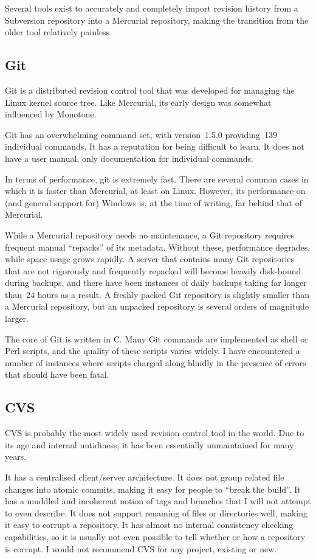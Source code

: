 Several tools exist to accurately and completely import revision
history from a Subversion repository into a Mercurial repository,
making the transition from the older tool relatively painless.

\subsection{Git}

Git is a distributed revision control tool that was developed for
managing the Linux kernel source tree.  Like Mercurial, its early
design was somewhat influenced by Monotone.

Git has an overwhelming command set, with version~1.5.0 providing~139
individual commands.  It has a reputation for being difficult to
learn.  It does not have a user manual, only documentation for
individual commands.

In terms of performance, git is extremely fast.  There are several
common cases in which it is faster than Mercurial, at least on Linux.
However, its performance on (and general support for) Windows is, at
the time of writing, far behind that of Mercurial.

While a Mercurial repository needs no maintenance, a Git repository
requires frequent manual ``repacks'' of its metadata.  Without these,
performance degrades, while space usage grows rapidly.  A server that
contains many Git repositories that are not rigorously and frequently
repacked will become heavily disk-bound during backups, and there have
been instances of daily backups taking far longer than~24 hours as a
result.  A freshly packed Git repository is slightly smaller than a
Mercurial repository, but an unpacked repository is several orders of
magnitude larger.

The core of Git is written in C.  Many Git commands are implemented as
shell or Perl scripts, and the quality of these scripts varies widely.
I have encountered a number of instances where scripts charged along
blindly in the presence of errors that should have been fatal.

\subsection{CVS}

CVS is probably the most widely used revision control tool in the
world.  Due to its age and internal untidiness, it has been
essentially unmaintained for many years.

It has a centralised client/server architecture.  It does not group
related file changes into atomic commits, making it easy for people to
``break the build''.  It has a muddled and incoherent notion of tags
and branches that I will not attempt to even describe.  It does not
support renaming of files or directories well, making it easy to
corrupt a repository.  It has almost no internal consistency checking
capabilities, so it is usually not even possible to tell whether or
how a repository is corrupt.  I would not recommend CVS for any
project, existing or new.

